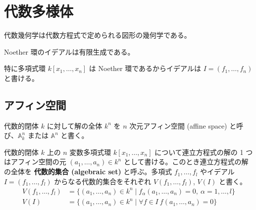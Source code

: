 \documentclass[uplatex,dvipdfmx,a4paper,11pt]{jlreq}
\title{}
\author{anko9801}
\renewcommand{\AA}{\mathbb{A}}
\numberwithin{equation}{section}
\theoremstyle{definition}
\begin{document}
\maketitle
\tableofcontents
\clearpage

\section{代数多様体}
代数幾何学は代数方程式で定められる図形の幾何学である。
\begin{theorem}
  Noether 環のイデアルは有限生成である。

  特に多項式環 $k[x_1,\ldots,x_n]$ は Noether 環であるからイデアルは $I = (f_1,\ldots,f_n)$ と書ける。
\end{theorem}

\subsection{アフィン空間}
\begin{definition}[アフィン空間]
  代数的閉体 $k$ に対して解の全体 $k^n$ を $n$ 次元アフィン空間 (affine space) と呼び、$\AA_k^n$ または $\AA^n$ と書く。
\end{definition}
代数的閉体 $k$ 上の $n$ 変数多項式環 $k[x_1,\ldots,x_n]$ について連立方程式の解の 1 つはアフィン空間の元 $(a_1,\ldots,a_n)\in k^n$ として書ける。このとき連立方程式の解の全体を \textbf{代数的集合 (algebraic set)} と呼ぶ。多項式 $f_1,\ldots,f_l$ やイデアル $I = (f_1,\ldots,f_l)$ からなる代数的集合をそれぞれ $V(f_1,\ldots,f_l)$, $V(I)$ と書く。
\begin{align}
  V(f_1, \ldots, f_l) & = \lbrace(a_1, \ldots, a_n)\in k^n\mid f_\alpha(a_1,\ldots,a_n) = 0,\ \alpha = 1,\ldots,l\rbrace \\
  V(I)                & = \lbrace(a_1, \ldots, a_n)\in k^n\mid \forall f\in I \ f(a_1,\ldots,a_n) = 0\rbrace
\end{align}
\end{document}
